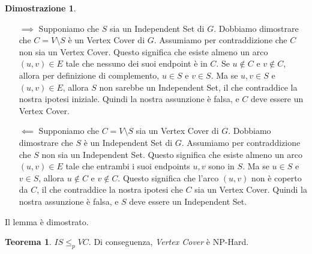 \documentclass[a4paper]{article}
\theoremstyle{definition} %
\newtheorem{theorem}{Teorema}
[section]
\theoremstyle{definition} %
\newtheorem*{proof*}{Dimostrazione}
\begin{document}
\begin{proof*}
\begin{itemize}
    \item[$\implies$] Supponiamo che $S$ sia un Independent Set di $G$.
    Dobbiamo dimostrare che $C = V \setminus S$ è un Vertex Cover di $G$.
    Assumiamo per contraddizione che $C$ non sia un Vertex Cover. Questo significa che esiste almeno un arco $(u, v) \in E$ tale che nessuno dei suoi endpoint è in $C$. Se $u \notin C$ e $v \notin C$, allora per definizione di complemento, $u \in S$ e $v \in S$. Ma se $u, v \in S$ e $(u, v) \in E$, allora $S$ non sarebbe un Independent Set, il che contraddice la nostra ipotesi iniziale. Quindi la nostra assunzione è falsa, e $C$ deve essere un Vertex Cover.

    \item[$\impliedby$] Supponiamo che $C = V \setminus S$ sia un Vertex Cover di $G$.
    Dobbiamo dimostrare che $S$ è un Independent Set di $G$.
    Assumiamo per contraddizione che $S$ non sia un Independent Set. Questo significa che esiste almeno un arco $(u, v) \in E$ tale che entrambi i suoi endpoints $u, v$ sono in $S$. Ma se $u \in S$ e $v \in S$, allora $u \notin C$ e $v \notin C$. Questo significa che l'arco $(u, v)$ non è coperto da $C$, il che contraddice la nostra ipotesi che $C$ sia un Vertex Cover. Quindi la nostra assunzione è falsa, e $S$ deve essere un Independent Set.
\end{itemize}
Il lemma è dimostrato.
\end{proof*}

\begin{theorem}
$IS \le_p VC$. Di conseguenza, \emph{Vertex Cover} è NP-Hard.
\end{theorem}
\end{document}
